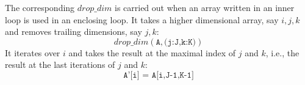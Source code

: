 \documentclass[sigconf, screen, natbib=false, dvipsnames, table]{acmart}
\theoremstyle{definition}
\begin{document}
The corresponding $\mathit{drop\_dim}$ is carried out when an array written in an inner loop is used in an enclosing loop. 
It takes a higher dimensional array, say $i,j,k$ and removes trailing dimensions, say $j,k$:
\[ \mathit{drop\_dim}(\texttt{A}, \texttt{(j:J,k:K)}) \]
It iterates over $i$ and takes the result at the maximal index of $j$ and $k$, i.e., the result at the last iterations of $j$ and $k$:
\[ \texttt{A'[i] = A[i,J-1,K-1]} \]

\end{document}
